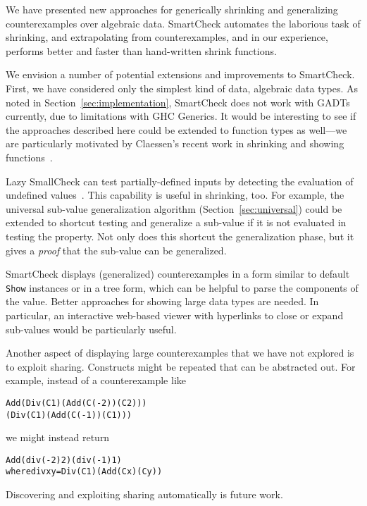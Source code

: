 \documentclass{sigplanconf}
\newenvironment{code}{\begin{alltt}}{\end{alltt}}
\newcommand{\ttp}[1]{\texttt{#1}}
\begin{document}
We have presented new approaches for generically shrinking and generalizing
counterexamples over algebraic data.  SmartCheck automates the laborious
task of shrinking, and extrapolating from counterexamples, and in our
experience, performs better and faster than hand-written shrink functions.

We envision a number of potential extensions and improvements to SmartCheck.
First, we have considered only the simplest kind of data, algebraic data types.
As noted in Section~\ref{sec:implementation}, SmartCheck does not work with
GADTs currently, due to limitations with GHC Generics.  It would be interesting
to see if the approaches described here could be extended to function types as
well---we are particularly motivated by Claessen's recent work in shrinking and
showing functions~\cite{claessen}.

Lazy SmallCheck can test partially-defined inputs by detecting the evaluation of
undefined values~\cite{sc}.  This capability is useful in shrinking, too.  For
example, the universal sub-value generalization algorithm
(Section~\ref{sec:universal}) could be extended to shortcut testing and
generalize a sub-value if it is not evaluated in testing the property.  Not only
does this shortcut the generalization phase, but it gives a \emph{proof} that the
sub-value can be generalized.

SmartCheck displays (generalized) counterexamples in a form similar to default
\ttp{Show} instances or in a tree form, which can be helpful to parse the
components of the value.  Better approaches for showing large data types are
needed.  In particular, an interactive web-based viewer with hyperlinks to close
or expand sub-values would be particularly useful.

Another aspect of displaying large counterexamples that we have not explored is
to exploit sharing.  Constructs might be repeated that can be abstracted out.
For example, instead of a counterexample like
%
\begin{code}
Add (Div (C 1) (Add (C (-2)) (C 2)))
    (Div (C 1) (Add (C (-1)) (C 1)))
\end{code}
%
\noindent
we might instead return
%
\begin{code}
Add (div (-2) 2) (div (-1) 1)
  where div x y = Div (C 1) (Add (C x) (C y))
\end{code}
%
\noindent
Discovering and exploiting sharing automatically is future work.

\end{document}
